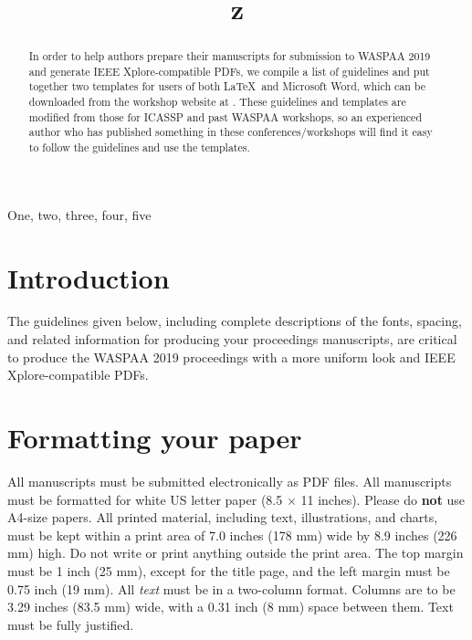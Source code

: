 \documentclass{article}
\title{z}
\begin{document}
\ninept
\maketitle

\begin{sloppy}

\begin{abstract}
  In order to help authors prepare their manuscripts for 
  submission to WASPAA 2019 and generate IEEE Xplore-compatible 
  PDFs, we compile a list of guidelines and put together two
  templates for users of both \LaTeX\ and Microsoft Word, which
  can be downloaded from the workshop website at \cite{waspaa17web}.
  These guidelines and templates are modified from those for 
  ICASSP and past WASPAA workshops, so an experienced author who 
  has published something in these conferences/workshops will 
  find it easy to follow the guidelines and use the templates.
\end{abstract}

\begin{keywords}
One, two, three, four, five
\end{keywords}

\section{Introduction}
\label{sec:intro}

The guidelines given below, including complete descriptions of 
the fonts, spacing, and related information for producing your 
proceedings manuscripts, are critical to produce the WASPAA 2019 
proceedings with a more uniform look and IEEE Xplore-compatible PDFs. 

\section{Formatting your paper}
\label{sec:format}

All manuscripts must be submitted electronically as PDF files. 
All manuscripts must be formatted for white US letter paper 
(8.5 $\times$ 11 inches). Please do {\bf not} use A4-size papers. 
All printed material, including text, illustrations, and charts, 
must be kept within a print area of 7.0 inches (178 mm) wide 
by 8.9 inches (226 mm) high. Do not write or print anything outside 
the print area. The top margin must be 1 inch (25 mm), except for 
the title page, and the left margin must be 0.75 inch (19 mm).  
All {\it text} must be in a two-column format. Columns are to be 
3.29 inches (83.5 mm) wide, with a 0.31 inch (8 mm) space between 
them. Text must be fully justified. 


\end{sloppy}
\end{document}

